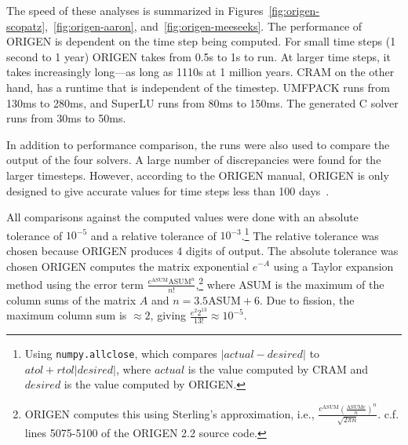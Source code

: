  The speed of these analyses is summarized in
Figures~\ref{fig:origen-scopatz},~\ref{fig:origen-aaron},
and~\ref{fig:origen-meeseeks}. The performance of ORIGEN is dependent on the
time step being computed. For small time steps (1 second to 1 year) ORIGEN
takes from 0.5\;s to 1\;s to run. At larger time steps, it takes increasingly
long---as long as 1110\;s at 1 million years. CRAM on the other hand, has a
runtime that is independent of the timestep. UMFPACK runs from 130\;ms to
280\;ms, and SuperLU runs from 80\;ms to 150\;ms. The generated C solver runs
from 30\;ms to 50\;ms. 

In addition to performance comparison, the runs were also used to compare the
output of the four solvers. A large number of discrepancies were found for the
larger timesteps. However, according to the ORIGEN manual, ORIGEN is only
designed to give accurate values for time steps less than 100
days~\cite{ationneeded}.

All comparisons against the computed values were done with an absolute
tolerance of $10^{-5}$ and a relative tolerance of $10^{-3}$.\footnote{Using
  \texttt{numpy.\allowbreak{}allclose}, which compares $|actual -
  desired|$ to $atol + rtol|desired|$,
  where $actual$ is the value computed by CRAM and $desired$ is the
  value computed by ORIGEN.} The relative tolerance was chosen because ORIGEN
produces 4 digits of output. The absolute tolerance was chosen ORIGEN computes
the matrix exponential $e^{-A}$ using a Taylor expansion method using the error term
$\frac{e^{\mathrm{ASUM}}\mathrm{ASUM}^n}{n!}$,\footnote{ORIGEN computes this using
    Sterling's approximation, i.e.,
    $\frac{e^{\mathrm{ASUM}}(\frac{\mathrm{ASUM}e}{n})^n}{\sqrt{2\pi
      n}}$. c.f. lines 5075-5100 of the ORIGEN 2.2 source code.} where
$\mathrm{ASUM}$ is the maximum of the column sums of the matrix $A$ and $n =
3.5\mathrm{ASUM} + 6$. Due to fission, the maximum
column sum is $\approx 2$, giving $\frac{e^{2}2^{13}}{13!}\approx 10^{-5}$.

